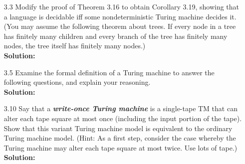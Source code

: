 \begin{enumerate}
\item[3.3]Modify the proof of Theorem 3.16 to obtain Corollary 3.19, showing that a language is decidable iff some nondeterministic Turing machine decides it. (You may assume the following theorem about trees. If every node in a tree has finitely many children and every branch of the tree has finitely many nodes, the tree itself has finitely many nodes.)
\\
\textbf{Solution:} \alreadyanswered

\item[3.5]Examine the formal definition of a Turing machine to answer the following questions, and explain your reasoning.
\\
\textbf{Solution:} \alreadyanswered

\item[3.10]Say that a \textbf{\emph{write-once Turing machine}} is a single-tape TM that can alter each tape square at most once (including the input portion of the tape). Show that this variant Turing machine model is equivalent to the ordinary Turing machine model. (Hint: As a first step, consider the case whereby the Turing machine may alter each tape square at most twice. Use lots of tape.)
\\
\textbf{Solution:} \alreadyanswered


\end{enumerate}
